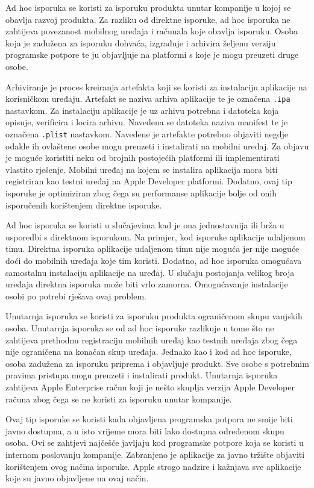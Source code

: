 \documentclass[times, utf8, diplomski, numeric]{fer}
\begin{document}
Ad hoc isporuka se koristi za isporuku produkta unutar kompanije u kojoj se obavlja razvoj produkta. Za razliku od direktne isporuke, ad hoc isporuka ne zahtijeva povezanost mobilnog uređaja i računala koje obavlja isporuku. Osoba koja je zadužena za isporuku dohvaća, izgrađuje i arhivira željenu verziju programske potpore te ju objavljuje na platformi s koje je mogu preuzeti druge osobe.

Arhiviranje je proces kreiranja artefakta koji se koristi za instalaciju aplikacije na korisničkom uređaju. Artefakt se naziva arhiva aplikacije te je označena \verb|.ipa| nastavkom. Za instalaciju aplikacije je uz arhivu potrebna i datoteka koja opisuje, verificira i locira arhivu. Navedena se datoteka naziva manifest te je označena \verb|.plist| nastavkom. Navedene je artefakte potrebno objaviti negdje odakle ih ovlaštene osobe mogu preuzeti i instalirati na mobilni uređaj. Za objavu je moguće koristiti neku od brojnih postojećih platformi ili implementirati vlastito rješenje. Mobilni uređaj na kojem se instalira aplikacija mora biti registriran kao testni uređaj na Apple Developer platformi. Dodatno, ovaj tip isporuke je optimiziran zbog čega su performanse aplikacije bolje od onih isporučenih korištenjem direktne isporuke.

Ad hoc isporuka se koristi u slučajevima kad je ona jednostavnija ili brža u usporedbi s direktnom isporukom. Na primjer, kod isporuke aplikacije udaljenom timu. Direktna isporuka aplikacije udaljenom timu nije moguća jer nije moguće doći do mobilnih uređaja koje tim koristi. Dodatno, ad hoc isporuka omogućava samostalnu instalaciju aplikacije na uređaj. U slučaju postojanja velikog broja uređaja direktna isporuka može biti vrlo zamorna. Omogućavanje instalacije osobi po potrebi rješava ovaj problem.

Unutarnja isporuka se koristi za isporuku produkta ograničenom skupu vanjskih osoba. Unutarnja isporuka se od ad hoc isporuke razlikuje u tome što ne zahtijeva prethodnu registraciju mobilnih uređaj kao testnih uređaja zbog čega nije ograničena na konačan skup uređaja. Jednako kao i kod ad hoc isporuke, osoba zadužena za isporuku priprema i objavljuje produkt. Sve osobe s potrebnim pravima pristupa mogu preuzeti i instalirati produkt. Unutarnja isporuka zahtijeva Apple Enterprise račun koji je nešto skuplja verzija Apple Developer računa zbog čega se ne koristi za isporuku unutar kompanije.

Ovaj tip isporuke se koristi kada objavljena programska potpora ne smije biti javno dostupna, a u isto vrijeme mora biti lako dostupna određenom skupu osoba. Ovi se zahtjevi najčešće javljaju kod programske potpore koja se koristi u internom poslovanju kompanije. Zabranjeno je aplikacije za javno tržište objaviti korištenjem ovog načina isporuke. Apple strogo nadzire i kažnjava sve aplikacije koje su javno objavljene na ovaj način.
\end{document}
